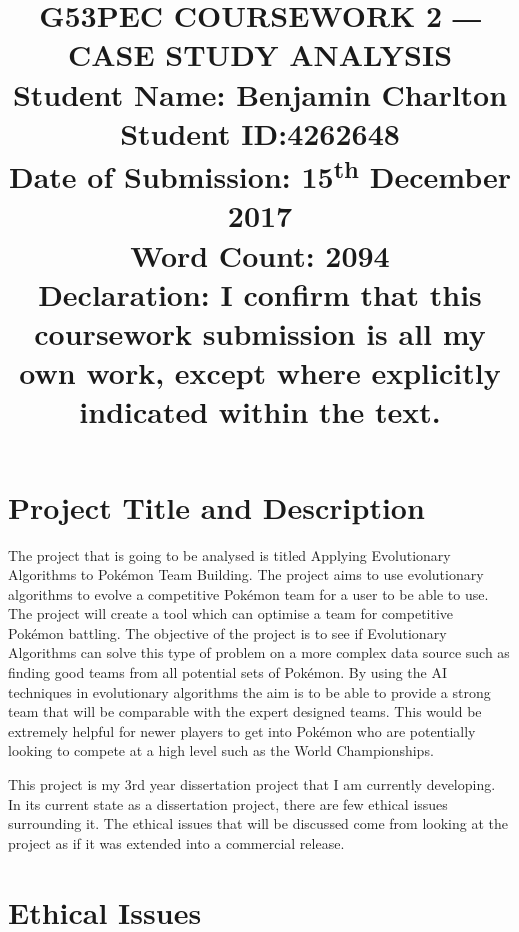 \documentclass[a4paper]{article}
\newcommand{\Pokemon}{Pok\'{e}mon}
\begin{document}
\title{
    G53PEC COURSEWORK 2 ― CASE STUDY ANALYSIS \\
    \large{Student Name: Benjamin Charlton \\
            Student ID:\@ 4262648 \\
            Date of Submission: 15\textsuperscript{th} December 2017\\
            Word Count: 2094\\
            Declaration: I confirm that this coursework submission is all my own work, except where explicitly indicated within the text.}
    \date{}}
\maketitle

\section{Project Title and Description}
The project that is going to be analysed is titled Applying Evolutionary Algorithms to \Pokemon{} Team Building.
The project aims to use evolutionary algorithms to evolve a competitive \Pokemon{} team for a user to be able to use.
The project will create a tool which can optimise a team for competitive Pokémon battling.
The objective of the project is to see if Evolutionary Algorithms can solve this type of problem on a more complex data source such as finding good teams from all potential sets of Pokémon.
By using the AI techniques in evolutionary algorithms the aim is to be able to provide a strong team that will be comparable with the expert designed teams.
This would be extremely helpful for newer players to get into \Pokemon{} who are potentially looking to compete at a high level such as the World Championships\cite{worldsOverview}.
\par
This project is my 3rd year dissertation project that I am currently developing.
In its current state as a dissertation project, there are few ethical issues surrounding it.
The ethical issues that will be discussed come from looking at the project as if it was extended into a commercial release.

\section{Ethical Issues}
\end{document}
